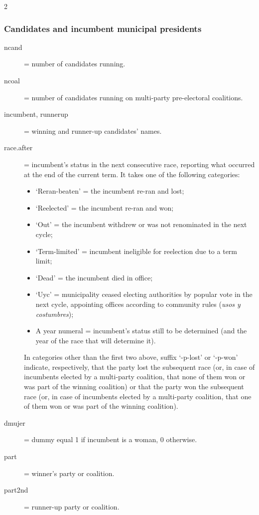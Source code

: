 \documentclass[letter,12pt]{article}
\begin{document}
\begin{singlespace}
\begin{multicols}{2}
\begin{footnotesize}
\subsubsection{Candidates and incumbent municipal presidents}
\begin{description}
\item[ncand] = number of candidates running.
\item[ncoal] = number of candidates running on multi-party pre-electoral coalitions. 
\item[incumbent, runnerup] = winning and runner-up candidates' names.
\item[race.after] = incumbent's status in the next consecutive race, reporting what occurred at the end of the current term. It takes one of the following categories:
  \begin{itemize}
  \item `Reran-beaten' = the incumbent re-ran and lost; 
  \item `Reelected' = the incumbent re-ran and won; 
  \item `Out' = the incumbent withdrew or was not renominated in the next cycle; 
  \item `Term-limited' = incumbent ineligible for reelection due to a term limit; 
  \item `Dead' = the incumbent died in office;
  \item `Uyc' = municipality ceased electing authorities by popular vote in the next cycle, appointing offices according to community rules (\emph{usos y costumbres});
  \item A year numeral = incumbent's status still to be determined (and the year of the race that will determine it).
  \end{itemize}
In categories other than the first two above, suffix `-p-lost' or `-p-won' indicate, respectively, that the party lost the subsequent race (or, in case of incumbents elected by a multi-party coalition, that none of them won or was part of the winning coalition) or that the party won the subsequent race (or, in case of incumbents elected by a multi-party coalition, that one of them won or was part of the winning coalition).
\item[dmujer] = dummy equal 1 if incumbent is a woman, 0 otherwise. 
\item[part] = winner's party or coalition.
\item[part2nd] = runner-up party or coalition.
\end{description}

\end{footnotesize}
\end{multicols}
\end{singlespace}
\end{document}
